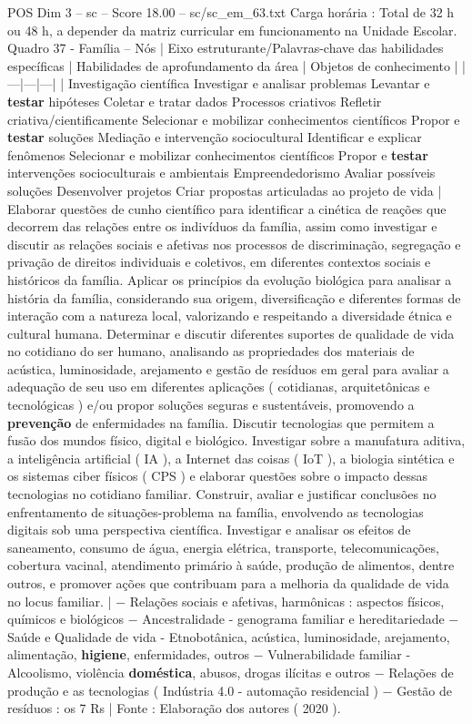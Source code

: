 \begin{textsample}{POS Dim 3 – sc – Score 18.00 – sc/sc\_em\_63.txt}
Carga horária : Total de 32 h ou 48 h, a depender da matriz curricular em funcionamento na Unidade Escolar.
Quadro 37 - Família – Nós | Eixo estruturante/Palavras-chave das habilidades específicas | Habilidades de aprofundamento da área | Objetos de conhecimento | |---|---|---| | Investigação científica Investigar e analisar problemas Levantar e \textbf{testar} hipóteses Coletar e tratar dados Processos criativos Refletir criativa/cientificamente Selecionar e mobilizar conhecimentos científicos Propor e \textbf{testar} soluções Mediação e intervenção sociocultural Identificar e explicar fenômenos Selecionar e mobilizar conhecimentos científicos Propor e \textbf{testar} intervenções socioculturais e ambientais Empreendedorismo Avaliar possíveis soluções Desenvolver projetos Criar propostas articuladas ao projeto de vida | Elaborar questões de cunho científico para identificar a cinética de reações que decorrem das relações entre os indivíduos da família, assim como investigar e discutir as relações sociais e afetivas nos processos de discriminação, segregação e privação de direitos individuais e coletivos, em diferentes contextos sociais e históricos da família.
Aplicar os princípios da evolução biológica para analisar a história da família, considerando sua origem, diversificação e diferentes formas de interação com a natureza local, valorizando e respeitando a diversidade étnica e cultural humana.
Determinar e discutir diferentes suportes de qualidade de vida no cotidiano do ser humano, analisando as propriedades dos materiais de acústica, luminosidade, arejamento e gestão de resíduos em geral para avaliar a adequação de seu uso em diferentes aplicações ( cotidianas, arquitetônicas e tecnológicas ) e/ou propor soluções seguras e sustentáveis, promovendo a \textbf{prevenção} de enfermidades na família.
Discutir tecnologias que permitem a fusão dos mundos físico, digital e biológico.
Investigar sobre a manufatura aditiva, a inteligência artificial ( IA ), a Internet das coisas ( IoT ), a biologia sintética e os sistemas ciber físicos ( CPS ) e elaborar questões sobre o impacto dessas tecnologias no cotidiano familiar.
Construir, avaliar e justificar conclusões no enfrentamento de situações-problema na família, envolvendo as tecnologias digitais sob uma perspectiva científica.
Investigar e analisar os efeitos de saneamento, consumo de água, energia elétrica, transporte, telecomunicações, cobertura vacinal, atendimento primário à saúde, produção de alimentos, dentre outros, e promover ações que contribuam para a melhoria da qualidade de vida no locus familiar. | − Relações sociais e afetivas, harmônicas : aspectos físicos, químicos e biológicos − Ancestralidade - genograma familiar e hereditariedade − Saúde e Qualidade de vida - Etnobotânica, acústica, luminosidade, arejamento, alimentação, \textbf{higiene}, enfermidades, outros − Vulnerabilidade familiar - Alcoolismo, violência \textbf{doméstica}, abusos, drogas ilícitas e outros − Relações de produção e as tecnologias ( Indústria 4.0 - automação residencial ) − Gestão de resíduos : os 7 Rs | Fonte : Elaboração dos autores ( 2020 ).

\end{textsample}
